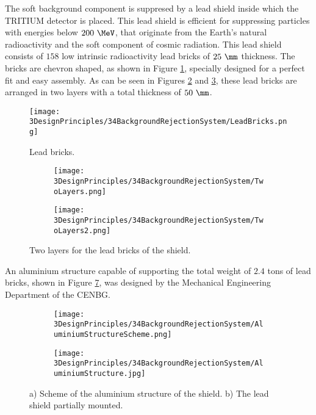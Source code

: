 The soft background component is suppresed by a lead shield inside which the TRITIUM detector is placed. This lead shield is efficient for suppressing particles with energies below $200~\MeV$, that originate from the Earth's natural radioactivity and the soft component of cosmic radiation. This lead shield consists of $158$ low intrinsic radioactivity lead bricks of $25~\mm$ thickness. The bricks are chevron shaped, as shown in Figure \ref{fig:LeadBrick}, specially designed for a perfect fit and easy assembly. As can be seen in Figures \ref{subfig:TwoLayers} and \ref{subfig:TwoLayers2}, these lead bricks are arranged in two layers with a total thickness of $50~\mm$. 

\begin{figure}[h]
\texttt{[image: 3DesignPrinciples/34BackgroundRejectionSystem/LeadBricks.png]}
\centering
\caption{Lead bricks.\label{fig:LeadBrick}}
\end{figure}

\begin{figure}[h]
\centering
    \begin{subfigure}[b]{0.5\textwidth}
    \centering
    \texttt{[image: 3DesignPrinciples/34BackgroundRejectionSystem/TwoLayers.png]}  
    \caption{\label{subfig:TwoLayers}}
    \end{subfigure}
    \hfill
    \begin{subfigure}[b]{0.4\textwidth}
    \centering
    \texttt{[image: 3DesignPrinciples/34BackgroundRejectionSystem/TwoLayers2.png]}  
    \caption{\label{subfig:TwoLayers2}}
    \end{subfigure}
 \caption{Two layers for the lead bricks of the shield.}
 \label{fig:LeadBricksAndArrangement}
\end{figure}

An aluminium structure capable of supporting the total weight of $2.4$ tons of lead bricks, shown in Figure \ref{fig:AluminiumStructure}, was designed by the Mechanical Engineering Department of the CENBG.

\begin{figure}
\centering
    \begin{subfigure}[b]{0.5\textwidth}
    \centering
    \texttt{[image: 3DesignPrinciples/34BackgroundRejectionSystem/AluminiumStructureScheme.png]}  
    \caption{\label{subfig:AluminiumStructureScheme}}
    \end{subfigure}
    \hfill
    \begin{subfigure}[b]{0.45\textwidth}
    \centering
    \texttt{[image: 3DesignPrinciples/34BackgroundRejectionSystem/AluminiumStructure.jpg]}  
    \caption{\label{subfig:AluminiumStructure}}
    \end{subfigure}
    \caption{a) Scheme of the aluminium structure of the shield. b) The lead shield partially mounted.}
 \label{fig:AluminiumStructure}
\end{figure}

